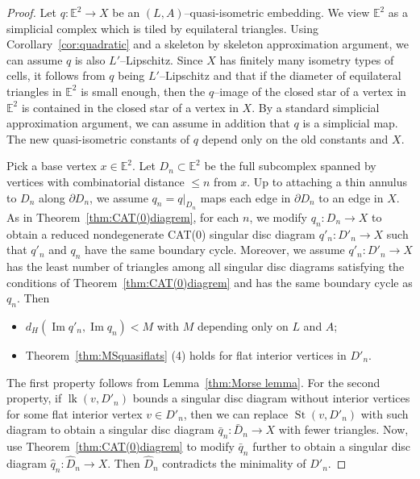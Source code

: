 \documentclass[11pt]{amsart}
\newcommand{\lk}{\operatorname{lk}}
\newcommand{\St}{\operatorname{St}}
\theoremstyle{definition}
\newcommand{\im}{\operatorname{Im}}
\begin{document}
\begin{proof}
Let $q\colon\mathbb E^2\to X$ be an $(L,A)$--quasi-isometric embedding. We view $\mathbb E^2$ as a simplicial complex which is tiled by equilateral triangles. Using Corollary~\ref{cor:quadratic} and a skeleton by skeleton approximation argument, we can assume $q$ is also $L'$--Lipschitz. Since $X$ has finitely many isometry types of cells, it follows from $q$ being $L'$--Lipschitz and \cite[Lemma I.7.54]{BridsonHaefliger1999} that if the diameter of equilateral triangles in $\mathbb E^2$ is small enough, then the $q$--image of the closed star of a vertex in $\mathbb E^2$ is contained in the closed star of a vertex in $X$. By a standard simplicial approximation argument, we can assume in addition that $q$ is a simplicial map. The new quasi-isometric constants of $q$ depend only on the old constants and $X$.

Pick a base vertex $x\in \mathbb E^2$. Let $D_n\subset \mathbb E^2$ be the full subcomplex spanned by vertices with combinatorial distance $\le n$ from $x$. Up to attaching a thin annulus to $D_n$ along $\partial D_n$, we assume $q_n=q|_{D_{n}}$ maps each edge in $\partial D_n$ to an edge in $X$. As in Theorem~\ref{thm:CAT(0)diagrem}, for each $n$, we modify $q_n\colon D_n\to X$ to obtain a reduced nondegenerate CAT(0) singular disc diagram $q'_n\colon D'_n\to X$ such that $q'_n$ and $q_n$ have the same boundary cycle. Moreover, we assume $q'_n\colon D'_n\to X$ has the least number of triangles among all singular disc diagrams satisfying the conditions of Theorem~\ref{thm:CAT(0)diagrem} and has the same boundary cycle as $q_n$. Then
\begin{itemize}
\item $d_H(\im q'_n, \im q_n)<M$ with $M$ depending only on $L$ and $A$;
\item Theorem~\ref{thm:MSquasiflats} (4) holds for flat interior vertices in $D'_n$.
\end{itemize}
The first property follows from Lemma~\ref{thm:Morse lemma}. For the second property, if $\lk(v,D'_n)$ bounds a singular disc diagram without interior vertices for some flat interior vertex $v\in D'_n$, then we can replace $\St(v,D'_n)$ with such diagram to obtain a singular disc diagram $\bar q_n\colon\bar D_n\to X$ with fewer triangles. Now, use Theorem~\ref{thm:CAT(0)diagrem} to modify $\bar q_n$ further to obtain a singular disc diagram $\hat q_n\colon\widehat D_n\to X$. Then $\widehat D_n$ contradicts the minimality of $D'_n$.


\end{proof}
\end{document}
